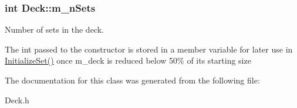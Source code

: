 \subsubsection[{\texorpdfstring{m\+\_\+n\+Sets}{m_nSets}}]{\setlength{\rightskip}{0pt plus 5cm}int Deck\+::m\+\_\+n\+Sets}\hypertarget{class_deck_af52c03d790a3182c7325d528839cd640}{}\label{class_deck_af52c03d790a3182c7325d528839cd640}


Number of sets in the deck. 

The int passed to the constructor is stored in a member variable for later use in \hyperlink{class_deck_a0fea69180a61a2bb810ca18698ebc119}{Initialize\+Set()} once m\+\_\+deck is reduced below 50\% of it\textquotesingle{}s starting size 

The documentation for this class was generated from the following file\+:\begin{DoxyCompactItemize}
\item 
Deck.\+h\end{DoxyCompactItemize}
